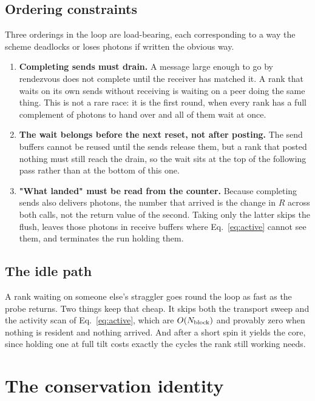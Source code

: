 \documentclass[11pt]{article}
\begin{document}
\subsection{Ordering constraints}

Three orderings in the loop are load-bearing, each corresponding to a way the scheme
deadlocks or loses photons if written the obvious way.

\begin{enumerate}
\item \textbf{Completing sends must drain.} A message large enough to go by rendezvous does
not complete until the receiver has matched it. A rank that waits on its own sends without
receiving is waiting on a peer doing the same thing. This is not a rare race: it is the
first round, when every rank has a full complement of photons to hand over and all of them
wait at once.

\item \textbf{The wait belongs before the next reset, not after posting.} The send buffers
cannot be reused until the sends release them, but a rank that posted nothing must still
reach the drain, so the wait sits at the top of the following pass rather than at the
bottom of this one.

\item \textbf{"What landed" must be read from the counter.} Because completing sends also
delivers photons, the number that arrived is the change in $R$ across both calls, not the
return value of the second. Taking only the latter skips the flush, leaves those photons in
receive buffers where Eq.~\eqref{eq:active} cannot see them, and terminates the run holding
them.
\end{enumerate}

\subsection{The idle path}

A rank waiting on someone else's straggler goes round the loop as fast as the probe
returns. Two things keep that cheap. It skips both the transport sweep and the activity
scan of Eq.~\eqref{eq:active}, which are $O(N_{\rm block})$ and provably zero when nothing
is resident and nothing arrived. And after a short spin it yields the core, since holding
one at full tilt costs exactly the cycles the rank still working needs.

\section{The conservation identity}
\label{sec:conservation}
\end{document}
